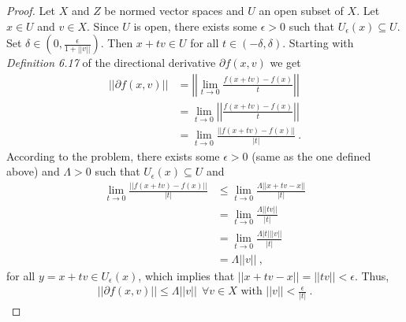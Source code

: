 \begin{questions}


\begin{solution}
  \begin{proof}
Let $X$ and $Z$ be normed vector spaces and $U$ an open subset of $X$. Let $x\in U$ and $v\in X$. Since $U$ is open, there exists some $\epsilon>0$ such that $U_{\epsilon}(x)\subseteq U$. Set $\delta\in (0,\frac{\epsilon}{1+||v||})$. Then $x+tv\in U$ for all $t\in(-\delta,\delta)$. Starting with \textit{Definition 6.17} of the directional derivative $\partial f(x,v)$ we get
  \begin{align*}  
  ||\partial f(x,v)||&=\left|\left|\lim_{t\rightarrow 0}\frac{f(x+tv)-f(x)}{t}\right|\right|\\
  &=\lim_{t\rightarrow 0}\left|\left|\frac{f(x+tv)-f(x)}{t}\right|\right|\\
  &=\lim_{t\rightarrow 0}\frac{\left|\left|f(x+tv)-f(x)\right|\right|}{|t|}~.
  \end{align*}
  According to the problem, there exists some $\epsilon>0$ (same as the one defined above) and $\Lambda>0$ such that $U_{\epsilon}(x)\subseteq U$ and
  \begin{align*}
  \lim_{t\rightarrow 0}\frac{\left|\left|f(x+tv)-f(x)\right|\right|}{|t|}&\leq \lim_{t\rightarrow 0}\frac{\Lambda ||x+tv-x||}{|t|}\\
  &=\lim_{t\rightarrow 0}\frac{\Lambda ||tv||}{|t|}\\
  &=\lim_{t\rightarrow 0}\frac{\Lambda |t|||v||}{|t|}\\
  &=\Lambda ||v||~,
  \end{align*}
for all $y=x+tv\in U_{\epsilon}(x)$, which implies that $||x+tv-x||=||tv||<\epsilon$. Thus,
\begin{align*}
||\partial f(x,v)||\leq \Lambda ||v||~~\forall v\in X\text{ with }||v||<\frac{\epsilon}{|t|}~.
\end{align*}
\end{proof}
\end{solution}
\end{questions}